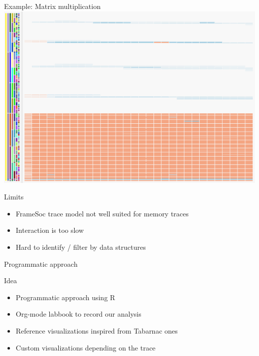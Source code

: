 \documentclass[xcolor={usenames,dvipsnames},hyperref={pdfusetitle}]{beamer}
\begin{document}
\begin{frame}{Example: Matrix multiplication}
{{{{                }{
                    \includegraphics[width=\textwidth]{ocelotl/Sharing-zoom.png}
                }
            }
        }
    }
    \pause
    \pause
    \pause
    \pause
\end{frame}%

\begin{frame}{Limits}
    \begin{itemize}
        \item FrameSoc trace model not well suited for memory traces
        \item Interaction is too slow
        \item Hard to identify / filter by data structures
    \end{itemize}
\end{frame}

\begin{frame}{Programmatic approach}
    \begin{block}{Idea}
        \begin{itemize}
            \item Programmatic approach using R
            \item Org-mode labbook to record our analysis
            \item Reference visualizations inspired from Tabarnac ones
            \item Custom visualizations depending on the trace
        \end{itemize}
    \end{block}
\end{frame}
\end{document}
